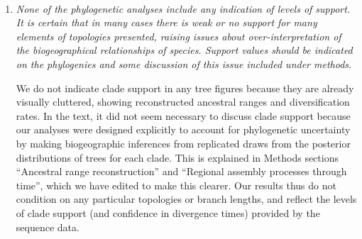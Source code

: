 \documentclass[12pt]{letter}
\begin{document}
\begin{letter}{ \\

}
\begin{enumerate}
  The BAMM estimates of net diversification rate depicted in Figure
  SXXX suggest that across most of the phylogeny, the rate is between
  about 0.15 and 0.2. This is not very different from the rates found
  by MEDUSA in de Vos et al.\ Figure 2, if you consider the 2 largest
  partitions where the values are 0.08 and 0.28, respectively.

  The reasons why BAMM does not find strong support for a shift in
  rates is a difficult question to answer because (1) our tree was
  different, as we sampled more species than de Vos et al. (354 vs.\
  265), and (2) they did not use BAMM, but instead analyzed
  diversification rates using MEDUSA, SymmeTREE, BiSSE, and
  BayesRate. Of those methods, only MEDUSA and SymmeTREE are
  comparable to BAMM in the sense of inferring the locations of rate
  shifts without \textit{a priori} hypotheses---in the case of de Vos
  et al., that faster diversification is associated with
  heterostyly. But the methods are otherwise very different in their
  model assumptions and algorithmic details. Unfortunately the
  phylogeny from de Vos et al.\ is not available on TreeBASE (despite
  what is stated in the paper) so we are unable to analyze it with
  BAMM for comparison.

\item \textit{None of the phylogenetic analyses include any indication
    of levels of support. It is certain that in many cases there is
    weak or no support for many elements of topologies presented,
    raising issues about over-interpretation of the biogeographical
    relationships of species. Support values should be indicated on
    the phylogenies and some discussion of this issue included under
    methods.}

  We do not indicate clade support in any tree figures because they
  are already visually cluttered, showing reconstructed ancestral
  ranges and diversification rates. In the text, it did not seem
  necessary to discuss clade support because our analyses were
  designed explicitly to account for phylogenetic uncertainty by
  making biogeographic inferences from replicated draws from the
  posterior distributions of trees for each clade. This is explained
  in Methods sections ``Ancestral range reconstruction'' and
  ``Regional assembly processes through time'', which we have edited
  to make this clearer. Our results thus do not condition on any
  particular topologies or branch lengths, and reflect the levels of
  clade support (and confidence in divergence times) provided by the
  sequence data.


\end{enumerate}
\end{letter}
\end{document}
